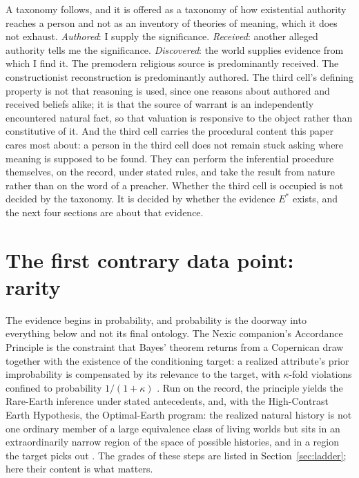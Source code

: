 A taxonomy follows, and it is offered as a taxonomy of how existential
authority reaches a person and not as an inventory of theories of
meaning, which it does not exhaust. \emph{Authored}: I supply the
significance. \emph{Received}: another alleged authority tells me the
significance. \emph{Discovered}: the world supplies evidence from which
I find it. The premodern religious source is predominantly received.
The constructionist reconstruction is predominantly authored. The third cell's
defining property is not that reasoning is used, since one reasons about
authored and received beliefs alike; it is that the source of warrant is
an independently encountered natural fact, so that valuation is
responsive to the object rather than constitutive of it. And the third
cell carries the procedural content this paper cares most about: a
person in the third cell does not remain stuck asking where meaning is
supposed to be found. They can perform the inferential procedure
themselves, on the record, under stated rules, and take the result from
nature rather than on the word of a preacher. Whether the third cell is
occupied is not decided by the taxonomy. It is decided by whether the
evidence $E^\ast$ exists, and the next four sections are about that
evidence.

\section{The first contrary data point: rarity}\label{sec:rarity}

The evidence begins in probability, and probability is the doorway into
everything below and not its final ontology. The Nexic companion's
Accordance Principle is the constraint that Bayes' theorem returns from
a Copernican draw together with the existence of the conditioning
target: a realized attribute's prior improbability is compensated by
its relevance to the target, with $\kappa$-fold violations confined to
probability $1/(1+\kappa)$ \cite{Nexus,GoldenTargeted}. Run on the record,
the principle yields the Rare-Earth inference under stated antecedents,
and, with the High-Contrast Earth Hypothesis, the Optimal-Earth
program: the realized natural history is not one ordinary member of a
large equivalence class of living worlds but sits in an extraordinarily
narrow region of the space of possible histories, and in a region the
target picks out \cite{AethusOptimalEarth}. The grades of these steps are
listed in Section~\ref{sec:ladder}; here their content is what matters.

